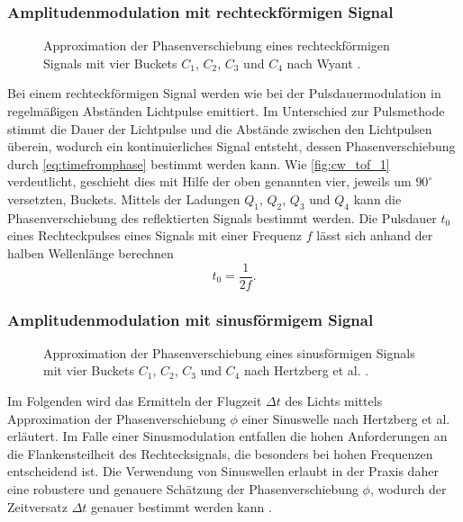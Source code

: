\documentclass[thesis.tex]{subfiles}
\begin{document}
\subsubsection{Amplitudenmodulation mit rechteckförmigen Signal}

\begin{figure}[ht]
    \centering
    \caption{Approximation der Phasenverschiebung eines rechteckförmigen Signals mit vier Buckets $C_1$, $C_2$, $C_3$ und $C_4$ nach Wyant \cite{bib:Wyant82}.}
    \label{fig:cw_tof_1}
\end{figure}

Bei einem rechteckförmigen Signal werden wie bei der Pulsdauermodulation in regelmäßigen Abständen Lichtpulse emittiert. Im Unterschied zur Pulsmethode stimmt die Dauer der Lichtpulse und die Abstände zwischen den Lichtpulsen überein, wodurch ein kontinuierliches Signal entsteht, dessen Phasenverschiebung durch \autoref{eq:timefromphase} bestimmt werden kann. Wie \autoref{fig:cw_tof_1} verdeutlicht, geschieht dies mit Hilfe der oben genannten vier, jeweils um $90^\circ$ versetzten, Buckets. Mittels der Ladungen $Q_1$, $Q_2$, $Q_3$ und $Q_4$ kann die Phasenverschiebung des reflektierten Signals bestimmt werden. Die Pulsdauer $t_0$ eines Rechteckpulses eines Signals mit einer Frequenz $f$ lässt sich anhand der halben Wellenlänge berechnen \begin{equation}t_0 = \frac{1}{2f}.\end{equation}

\subsubsection{Amplitudenmodulation mit sinusförmigem Signal}\label{sec:modulated_sinus_signal}

\begin{figure}[ht]
    \centering
    \caption{Approximation der Phasenverschiebung eines sinusförmigen Signals mit vier Buckets $C_1$, $C_2$, $C_3$ und $C_4$ nach Hertzberg et al. \cite{bib:Hertzberg2014}.}
    \label{fig:cw_tof_2}
\end{figure}

Im Folgenden wird das Ermitteln der Flugzeit $\Delta t$ des Lichts mittels Approximation der Phasenverschiebung $\phi$ einer Sinuswelle nach Hertzberg et al. \cite{bib:Hertzberg2014} erläutert. Im Falle einer Sinusmodulation entfallen die hohen Anforderungen an die Flankensteilheit des Rechtecksignals, die besonders bei hohen Frequenzen entscheidend ist. Die Verwendung von Sinuswellen erlaubt in der Praxis daher eine robustere und genauere Schätzung der Phasenverschiebung $\phi$, wodurch der Zeitversatz $\Delta t$ genauer bestimmt werden kann \cite{bib:Giancola2018}.
\end{document}
